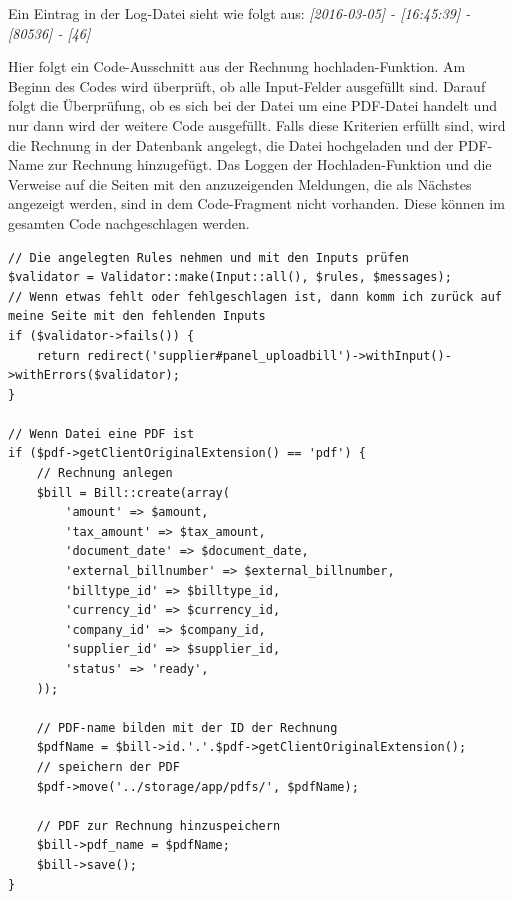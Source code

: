Ein Eintrag in der Log-Datei sieht wie folgt aus: \newline 
\textit{[2016-03-05] - [16:45:39] - [80536] - [46]}

\newpage
Hier folgt ein Code-Ausschnitt aus der \glqq Rechnung hochladen\grqq{}-Funktion. Am Beginn des Codes wird überprüft, ob alle Input-Felder ausgefüllt sind. Darauf folgt die Überprüfung, ob es sich bei der Datei um eine PDF-Datei handelt und nur dann wird der weitere Code ausgefüllt. Falls diese Kriterien erfüllt sind, wird die Rechnung in der Datenbank angelegt, die Datei hochgeladen und der PDF-Name zur Rechnung hinzugefügt. Das Loggen der Hochladen-Funktion und die Verweise auf die Seiten mit den anzuzeigenden Meldungen, die als Nächstes angezeigt werden, sind in dem Code-Fragment nicht vorhanden. Diese können im gesamten Code nachgeschlagen werden.



\begin{lstlisting}
// Die angelegten Rules nehmen und mit den Inputs prüfen
$validator = Validator::make(Input::all(), $rules, $messages);
// Wenn etwas fehlt oder fehlgeschlagen ist, dann komm ich zurück auf meine Seite mit den fehlenden Inputs
if ($validator->fails()) {
    return redirect('supplier#panel_uploadbill')->withInput()->withErrors($validator);
}

// Wenn Datei eine PDF ist
if ($pdf->getClientOriginalExtension() == 'pdf') {
    // Rechnung anlegen
    $bill = Bill::create(array(
        'amount' => $amount,
        'tax_amount' => $tax_amount,
        'document_date' => $document_date,
        'external_billnumber' => $external_billnumber,
        'billtype_id' => $billtype_id,
        'currency_id' => $currency_id,
        'company_id' => $company_id,
        'supplier_id' => $supplier_id,
        'status' => 'ready',
    ));

    // PDF-name bilden mit der ID der Rechnung
    $pdfName = $bill->id.'.'.$pdf->getClientOriginalExtension();
    // speichern der PDF
    $pdf->move('../storage/app/pdfs/', $pdfName);

    // PDF zur Rechnung hinzuspeichern
    $bill->pdf_name = $pdfName;
    $bill->save();
}
\end{lstlisting}


